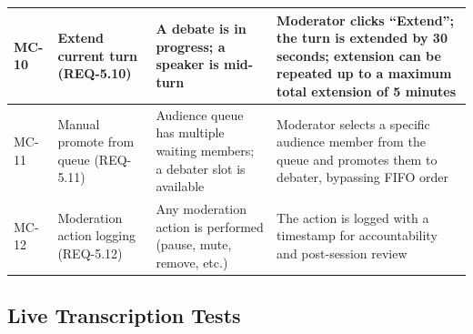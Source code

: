 \documentclass[12pt]{article}
\begin{document}
\begin{longtable}{|p{1.5cm}|p{3cm}|p{4cm}|p{4cm}|}
\hline
MC-10 & Extend current turn (REQ-5.10) & A debate is in progress; a speaker is mid-turn & Moderator clicks ``Extend''; the turn is extended by 30 seconds; extension can be repeated up to a maximum total extension of 5 minutes \\
\hline
MC-11 & Manual promote from queue (REQ-5.11) & Audience queue has multiple waiting members; a debater slot is available & Moderator selects a specific audience member from the queue and promotes them to debater, bypassing FIFO order \\
\hline
MC-12 & Moderation action logging (REQ-5.12) & Any moderation action is performed (pause, mute, remove, etc.) & The action is logged with a timestamp for accountability and post-session review \\
\hline
\end{longtable}

\subsection{Live Transcription Tests}
\end{document}
